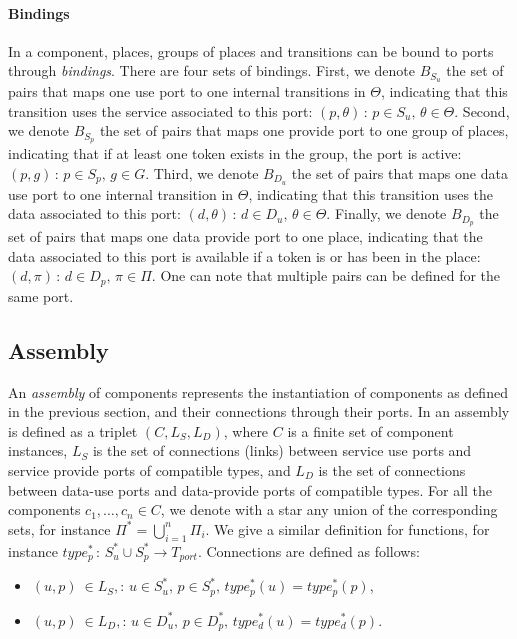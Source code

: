\paragraph{Bindings}{

  In a \mad component, places, groups of places and transitions can be
  bound to ports through \emph{bindings}. There are four sets of
  bindings.  First, we denote $B_{S_{u}}$ the set of pairs that maps
  one use port to one internal transitions in $\Theta$, indicating
  that this transition uses the service associated to this port:
  $\left(p,\theta\right)\,:\,p\in S_{u},\,\theta\in\Theta$. Second, we
  denote $B_{S_{p}}$ the set of pairs that maps one provide port to
  one group of places, indicating that if at least one token exists in
  the group, the port is active:
  $\left(p,g\right)\,:\,p\in S_{p},\,g\in G$. Third, we denote
  $B_{D_{u}}$ the set of pairs that maps one data use port to one
  internal transition in $\Theta$, indicating that this transition
  uses the data associated to this port:
  $\left(d,\theta\right)\,:\,d\in D_{u},\,\theta\in\Theta$. Finally,
  we denote $B_{D_{p}}$ the set of pairs that maps one data provide
  port to one place, indicating that the data associated to this port
  is available if a token is or has been in the place:
  $\left(d,\pi\right)\,:\,d\in D_{p},\,\pi\in \Pi$. One can note that
  multiple pairs can be defined for the same port.}

\subsection{Assembly}

An \emph{assembly} of components represents the instantiation of
components as defined in the previous section, and their connections
through their ports. In \mad an assembly is defined as a triplet
$(C, L_S, L_D)$, where $C$ is a finite set of component instances,
$L_S$ is the set of connections (links) between service use ports and
service provide ports of compatible types, and $L_D$ is the set of
connections between data-use ports and data-provide ports of
compatible types. For all the components $c_1,\dots,c_n \in C$, we
denote with a star any union of the corresponding sets, for instance
$\Pi^*=\bigcup_{i=1}^{n}\Pi_{i}$. We give a similar definition
for functions, for instance
$type_{p}^*\,:\,S_{u}^*\cup S_{p}^*\rightarrow T_{port}$. Connections
are defined as follows:

\begin{itemize}
\item $\left(u,p\right)\ \in L_S,:\,u\in S_{u}^{*},\,p\in S_{p}^{*},\,type_{p}^{*}\left(u\right)=type_{p}^{*}\left(p\right)$,
\item $\left(u,p\right)\ \in L_D,:\,u\in D_{u}^{*},\,p\in D_{p}^{*},\,type_{d}^{*}\left(u\right)=type_{d}^{*}\left(p\right)$.
\end{itemize}

